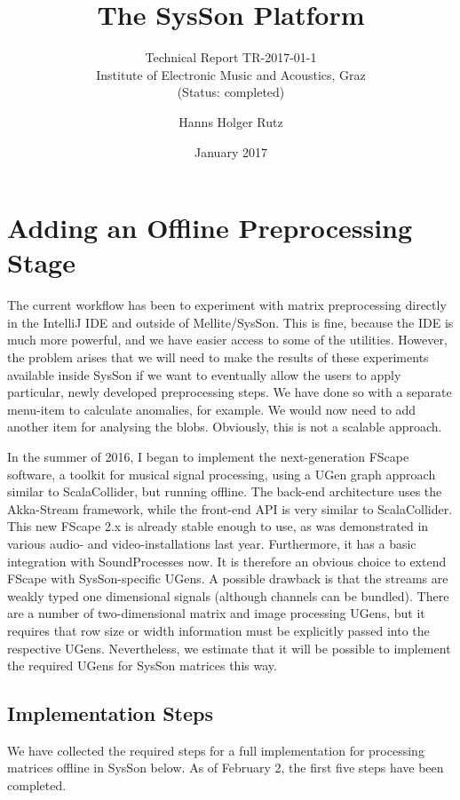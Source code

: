 \documentclass[11pt,a4paper]{article}
\title{The SysSon Platform}
\subtitle{Technical Report TR-2017-01-1\\Institute of Electronic Music and Acoustics, Graz\\(Status: completed)}
\author{Hanns Holger Rutz}
\date{January 2017}
\begin{document}
\maketitle
{}
\thispagestyle{empty}
\newpage
\section{Adding an Offline Preprocessing Stage}

The current workflow has been to experiment with matrix preprocessing directly in the IntelliJ IDE and outside of Mellite/SysSon. This is fine, because the IDE is much more powerful, and we have easier access to some of the utilities. However, the problem arises that we will need to make the results of these experiments available inside SysSon if we want to eventually allow the users to apply particular, newly developed preprocessing steps. We have done so with a separate menu-item to calculate anomalies, for example. We would now need to add another item for analysing the blobs. Obviously, this is not a scalable approach.

In the summer of 2016, I began to implement the next-generation FScape software, a toolkit for musical signal processing, using a UGen graph approach similar to ScalaCollider, but running offline. The back-end architecture uses the Akka-Stream framework, while the front-end API is very similar to ScalaCollider. This new FScape 2.x is already stable enough to use, as was demonstrated in various audio- and video-installations last year. Furthermore, it has a basic integration with SoundProcesses now. It is therefore an obvious choice to extend FScape with SysSon-specific UGens. A possible drawback is that the streams are weakly typed one dimensional signals (although channels can be bundled). There are a number of two-dimensional matrix and image processing UGens, but it requires that row size or width information must be explicitly passed into the respective UGens. Nevertheless, we estimate that it will be possible to implement the required UGens for SysSon matrices this way.

\subsection{Implementation Steps}

We have collected the required steps for a full implementation for processing matrices offline in SysSon below. As of February 2, the first five steps have been completed.
\end{document}
